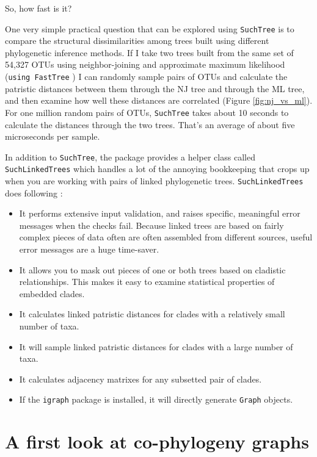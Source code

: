 \documentclass[
10pt, %
a4paper, %
oneside, %
headinclude,footinclude, %
BCOR5mm, %
]{scrartcl}
\begin{document}
So, how fast is it?



One very simple practical question that can be explored using {\tt SuchTree} is to compare the structural dissimilarities among trees built using different phylogenetic inference methods. If I take two trees built from the same set of 54,327 OTUs using neighbor-joining and approximate maximum likelihood ({\tt using FastTree} \cite{price2010fasttree,}) I can randomly sample pairs of OTUs and calculate the patristic distances between them through the NJ tree and through the ML tree, and then examine how well these distances are correlated (Figure \ref{fig:nj_vs_ml}). For one million random pairs of OTUs, {\tt SuchTree} takes about 10 seconds to calculate the distances through the two trees. That's an average of about five microseconds per sample.

In addition to {\tt SuchTree}, the package provides a helper class called {\tt SuchLinkedTrees} which handles a lot of the annoying bookkeeping that crops up when you are working with pairs of linked phylogenetic trees. {\tt SuchLinkedTrees} does following :

\begin{itemize}
\item It performs extensive input validation, and raises specific, meaningful error messages when the checks fail. Because linked trees are based on fairly complex pieces of data often are often assembled from different sources, useful error messages are a huge time-saver.
\item It allows you to mask out pieces of one or both trees based on cladistic relationships. This makes it easy to examine statistical properties of embedded clades.
\item It calculates linked patristic distances for clades with a relatively small number of taxa.
\item It will sample linked patristic distances for clades with a large number of taxa.
\item It calculates adjacency matrixes for any subsetted pair of clades.
\item If the {\tt igraph} package is installed, it will directly generate {\tt Graph} objects.
\end{itemize}

\section{A first look at co-phylogeny graphs}
\end{document}
